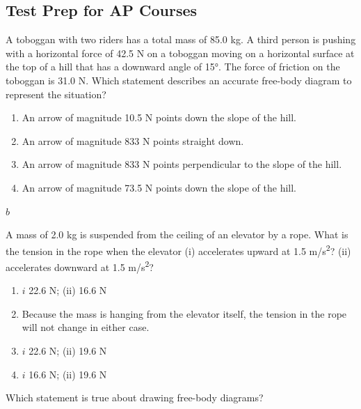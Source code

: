 \documentclass[
]{book}
\providecommand{\tightlist}{%
  \setlength{\itemsep}{0pt}\setlength{\parskip}{0pt}}
\newenvironment{ap-test-prep}{}{}
\begin{document}
\hypertarget{fs-id2154547}{}
\begin{ap-test-prep}

\hypertarget{test-prep-for-ap-courses-12}{%
\subsection{Test Prep for AP Courses}\label{test-prep-for-ap-courses-12}}

\hypertarget{fs-id1642540}{}
\leavevmode\hypertarget{fs-id1743101}{}%
A toboggan with two riders has a total mass of 85.0 kg. A third person
is pushing with a horizontal force of 42.5 N on a toboggan moving on a
horizontal surface at the top of a hill that has a downward angle of
15°. The force of friction on the toboggan is 31.0 N. Which statement
describes an accurate free-body diagram to represent the situation?

\begin{enumerate}
\def\labelenumi{\alph{enumi}.}
\tightlist
\item
  An arrow of magnitude 10.5 N points down the slope of the hill.
\item
  An arrow of magnitude 833 N points straight down.
\item
  An arrow of magnitude 833 N points perpendicular to the slope of the
  hill.
\item
  An arrow of magnitude 73.5 N points down the slope of the hill.
\end{enumerate}

\leavevmode\hypertarget{fs-id1348979}{}%
\(b\)

\hypertarget{fs-id1459777}{}
\leavevmode\hypertarget{fs-id1597774}{}%
A mass of 2.0 kg is suspended from the ceiling of an elevator by a rope.
What is the tension in the rope when the elevator (i) accelerates upward
at 1.5 m/s\textsuperscript{2}? (ii) accelerates downward at 1.5 m/s\textsuperscript{2}?

\begin{enumerate}
\def\labelenumi{\alph{enumi}.}
\tightlist
\item
  \(i\) 22.6 N; (ii) 16.6 N
\item
  Because the mass is hanging from the elevator itself, the tension in
  the rope will not change in either case.
\item
  \(i\) 22.6 N; (ii) 19.6 N
\item
  \(i\) 16.6 N; (ii) 19.6 N
\end{enumerate}

\hypertarget{fs-id1795701}{}
\leavevmode\hypertarget{fs-id1479760}{}%
Which statement is true about drawing free-body diagrams?


\end{ap-test-prep}
\end{document}
